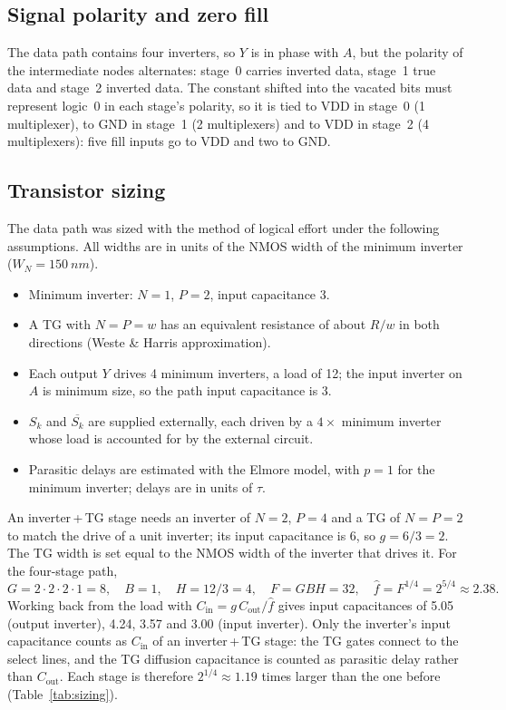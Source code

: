 \documentclass[11pt]{article}
\begin{document}
\subsection{Signal polarity and zero fill}
The data path contains four inverters, so $Y$ is in phase with $A$, but the
polarity of the intermediate nodes alternates: stage~0 carries inverted
data, stage~1 true data and stage~2 inverted data. The constant shifted into
the vacated bits must represent logic~0 in each stage's polarity, so it is
tied to VDD in stage~0 (1 multiplexer), to GND in stage~1 (2 multiplexers)
and to VDD in stage~2 (4 multiplexers): five fill inputs go to VDD and two to
GND.

\subsection{Transistor sizing}
\label{sec:sizing}
The data path was sized with the method of logical effort under the
following assumptions. All widths are in units of the NMOS width of the
minimum inverter ($W_N = \SI{150}{nm}$).
\begin{itemize}
  \setlength\itemsep{0pt}
  \item Minimum inverter: $N=1$, $P=2$, input capacitance 3.
  \item A TG with $N=P=w$ has an equivalent resistance of about $R/w$ in
        both directions (Weste \& Harris approximation).
  \item Each output $Y$ drives 4 minimum inverters, a load of 12; the input
        inverter on $A$ is minimum size, so the path input capacitance is 3.
  \item $S_k$ and $\overline{S_k}$ are supplied externally, each driven by a
        $4\times$ minimum inverter whose load is accounted for by the
        external circuit.
  \item Parasitic delays are estimated with the Elmore model, with $p=1$ for
        the minimum inverter; delays are in units of $\tau$.
\end{itemize}

An inverter\,+\,TG stage needs an inverter of $N=2$, $P=4$ and a TG of
$N=P=2$ to match the drive of a unit inverter; its input capacitance is 6,
so $g = 6/3 = 2$. The TG width is set equal to the NMOS width of the
inverter that drives it. For the four-stage path,
\[
G = 2\cdot2\cdot2\cdot1 = 8,\quad B = 1,\quad H = 12/3 = 4,\quad
F = GBH = 32,\quad \hat f = F^{1/4} = 2^{5/4} \approx 2.38 .
\]
Working back from the load with $C_\text{in} = g\,C_\text{out}/\hat f$ gives
input capacitances of 5.05 (output inverter), 4.24, 3.57 and 3.00 (input
inverter). Only the inverter's input capacitance counts as $C_\text{in}$ of
an inverter\,+\,TG stage: the TG gates connect to the select lines, and the
TG diffusion capacitance is counted as parasitic delay rather than
$C_\text{out}$. Each stage is therefore $2^{1/4} \approx 1.19$ times larger
than the one before (Table~\ref{tab:sizing}).
\end{document}
